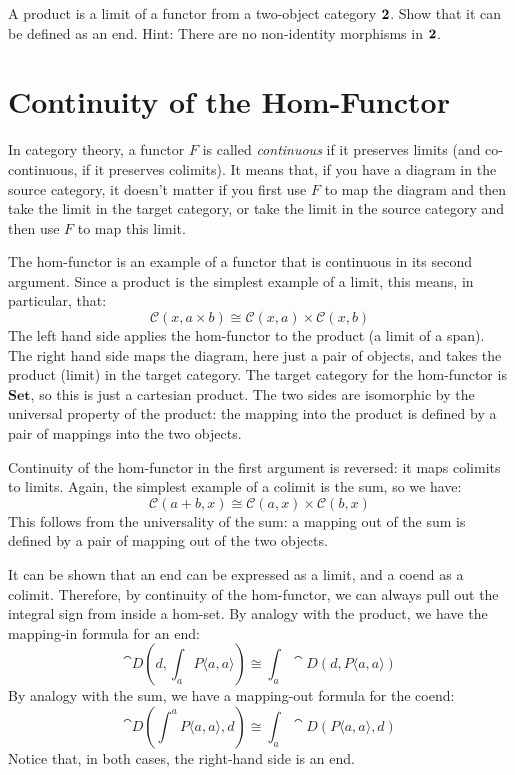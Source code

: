 \documentclass[DaoFP]{subfiles}
\begin{document}
\begin{exercise}
A product is a limit of a functor from a two-object category $\mathbf{2}$. Show that it can be defined as an end. Hint: There are no non-identity morphisms in $\mathbf{2}$.
\end{exercise}

\section{Continuity of the Hom-Functor}

In category theory, a functor $F$ is called \emph{continuous} if it preserves limits (and co-continuous, if it preserves colimits). It means that, if you have a diagram in the source category, it doesn't matter if you first use $F$ to map the diagram and then take the limit in the target category, or take the limit in the source category and then use $F$ to map this limit. 

The hom-functor is an example of a functor that is continuous in its second argument. Since a product is the simplest example of a limit, this means, in particular, that:
\[ \mathcal{C}(x, a \times b) \cong \mathcal{C}(x, a) \times \mathcal{C}(x, b) \]
The left hand side applies the hom-functor to the product (a limit of a span). The right hand side maps the diagram, here just a pair of objects, and takes the product (limit) in the target category. The target category for the hom-functor is $\mathbf{Set}$, so this is just a cartesian product. The two sides are isomorphic by the universal property of the product: the mapping into the product is defined by a pair of mappings into the two objects. 

Continuity of the hom-functor in the first argument is reversed: it maps colimits to limits. Again, the simplest example of a colimit is the sum, so we have:
\[ \mathcal{C}(a + b, x) \cong \mathcal{C}(a, x) \times \mathcal{C}(b, x) \]
This follows from the universality of the sum: a mapping out of the sum is defined by a pair of mapping out of the two objects.

It can be shown that an end can be expressed as a limit, and a coend as a colimit. Therefore, by continuity of the hom-functor, we can always pull out the integral sign from inside a hom-set. By analogy with the product, we have the mapping-in formula for an end:
\[\cat D\left(d, \int_a P\langle a, a \rangle \right) \cong \int_a \cat D(d, P\langle a, a \rangle) \]
By analogy with the sum, we have a mapping-out formula for the coend:
\[\cat D\left( \int^a P\langle a, a \rangle , d \right) \cong \int_a \cat D(P\langle a, a \rangle, d) \]
Notice that, in both cases, the right-hand side is an end.
\end{document}
